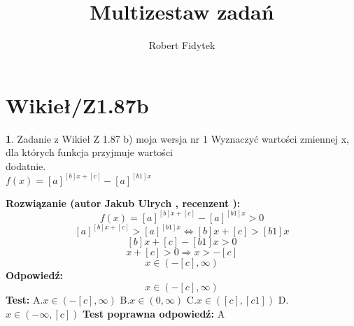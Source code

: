 \documentclass[12pt, a4paper]{article}
\title{Multizestaw zadań}
\author{Robert Fidytek}
\date{}
\theoremstyle{definition} %
\newtheorem{zad}{}
\newcommand{\kategoria}[1]{\section{#1}} %
\newcommand{\zadStart}[1]{\begin{zad}#1\newline} %
\newcommand{\zadStop}{\end{zad}}   %
\newcommand{\rozwStart}[2]{\noindent \textbf{Rozwiązanie (autor #1 , recenzent #2): }\newline} %
\newcommand{\rozwStop}{\newline}                                            %
\newcommand{\odpStart}{\noindent \textbf{Odpowiedź:}\newline}    %
\newcommand{\odpStop}{\newline}                                             %
\newcommand{\testStart}{\noindent \textbf{Test:}\newline} %
\newcommand{\testStop}{\newline} %
\newcommand{\kluczStart}{\noindent \textbf{Test poprawna odpowiedź:}\newline} %
\newcommand{\kluczStop}{\newline} %
\begin{document}
\maketitle


\kategoria{Wikieł/Z1.87b}
\zadStart{Zadanie z Wikieł Z 1.87 b) moja wersja nr 1}
Wyznaczyć wartości zmiennej x, dla których funkcja przyjmuje wartości\\ dodatnie.\\ $f(x)=[a]^{[b]x+[c]}-[a]^{[b1]x}$
\zadStop
\rozwStart{Jakub Ulrych}{}
$$f(x)=[a]^{[b]x+[c]}-[a]^{[b1]x}>0$$
$$[a]^{[b]x+[c]}>[a]^{[b1]x}\Leftrightarrow [b]x+[c]>[b1]x$$
$$[b]x+[c]-[b1]x>0$$
$$x+[c]>0\Rightarrow x>-[c]$$
$$x\in(-[c],\infty)$$
\rozwStop
\odpStart
$$x\in(-[c],\infty)$$
\odpStop
\testStart
A.$x\in(-[c],\infty)$
B.$x\in(0,\infty)$
C.$x\in([c],[c1])$
D.$x\in(-\infty,[c])$
\testStop
\kluczStart
A
\kluczStop
\end{document}
